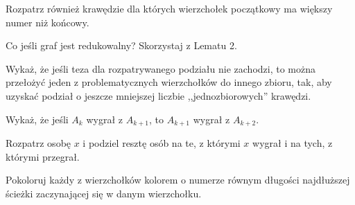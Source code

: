 
\begin{hints_list}
	\item Rozpatrz również krawędzie dla których wierzchołek początkowy ma większy numer niż końcowy.
	\item Co jeśli graf jest redukowalny? Skorzystaj z Lematu 2.
	\item Wykaż, że jeśli teza dla rozpatrywanego podziału nie zachodzi, to można przełożyć jeden z problematycznych wierzchołków do innego zbioru, tak, aby uzyskać podział o jeszcze mniejszej liczbie ,,jednozbiorowych'' krawędzi.
	\item Wykaż, że jeśli $A_k$ wygrał z $A_{k + 1}$, to $A_{k + 1}$ wygrał z $A_{k + 2}$.
	\item Rozpatrz osobę $x$ i podziel resztę osób na te, z którymi $x$ wygrał i na tych, z którymi przegrał. 
	\item Pokoloruj każdy z wierzchołków kolorem o numerze równym długości najdłuższej ścieżki zaczynającej się w danym wierzchołku.
\end{hints_list}